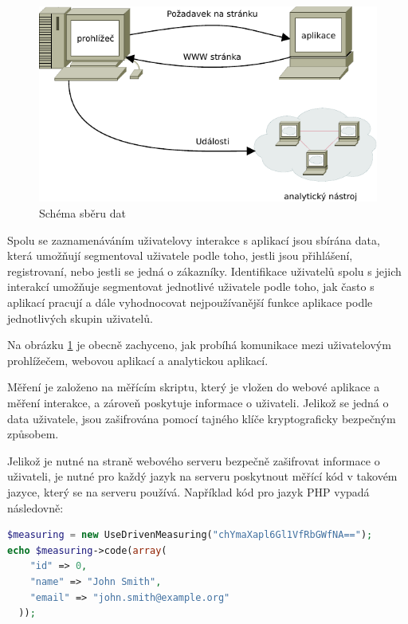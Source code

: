 \documentclass[bc,male,java,dept456]{diploma}						%
\begin{document}
\begin{figure}[h]
	\centering
	\includegraphics[width=14cm]{img/measuring.pdf}
	\caption{Schéma sběru dat}
	\label{img:measuring}
\end{figure}

Spolu se zaznamenáváním uživatelovy interakce s aplikací jsou sbírána data, která umožňují segmentoval uživatele podle toho, jestli jsou přihlášení, registrovaní, nebo jestli se jedná o zákazníky. Identifikace uživatelů spolu s jejich interakcí umožňuje segmentovat jednotlivé uživatele podle toho, jak často s aplikací pracují a dále vyhodnocovat nejpoužívanější funkce aplikace podle jednotlivých skupin uživatelů.

Na obrázku \ref{img:measuring} je obecně zachyceno, jak probíhá komunikace mezi uživatelovým pro\-hlí\-že\-čem, webovou aplikací a analytickou aplikací.


Měření je založeno na měřícím skriptu, který je vložen do webové aplikace a měření interakce, a zároveň poskytuje informace o uživateli. Jelikož se jedná o data uživatele, jsou zašifrována pomocí tajného klíče kryptograficky bezpečným způsobem.

Jelikož je nutné na straně webového serveru bezpečně zašifrovat informace o uživateli, je nutné pro každý jazyk na serveru poskytnout měřící kód v takovém jazyce, který se na serveru používá. Například kód pro jazyk PHP vypadá následovně:

\begin{lstlisting}[label=src:neco,language=PHP, caption=Měřící kód na straně serveru (PHP)]
$measuring = new UseDrivenMeasuring("chYmaXapl6Gl1VfRbGWfNA==");
echo $measuring->code(array(
    "id" => 0,
    "name" => "John Smith",
    "email" => "john.smith@example.org"
  ));
\end{lstlisting}
\end{document}
